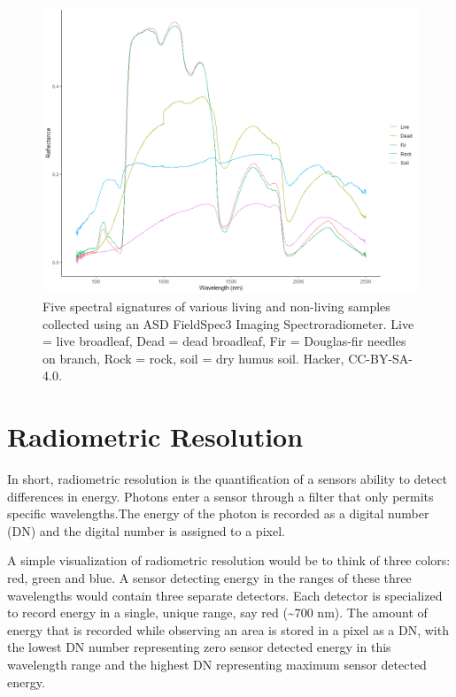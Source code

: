 \documentclass[
]{book}
\begin{document}
\begin{figure}
\includegraphics[width=2\linewidth]{images/11-spectralsig} \caption{Five spectral signatures of various living and non-living samples collected using an ASD FieldSpec3 Imaging Spectroradiometer. Live = live broadleaf, Dead = dead broadleaf, Fir = Douglas-fir needles on branch, Rock = rock, soil = dry humus soil. Hacker, CC-BY-SA-4.0.}\label{fig:11-specsig}
\end{figure}

\section{Radiometric Resolution}\label{radiometric-resolution}

In short, radiometric resolution is the quantification of a sensors ability to detect differences in energy. Photons enter a sensor through a filter that only permits specific wavelengths.The energy of the photon is recorded as a digital number (DN) and the digital number is assigned to a pixel.

A simple visualization of radiometric resolution would be to think of three colors: red, green and blue. A sensor detecting energy in the ranges of these three wavelengths would contain three separate detectors. Each detector is specialized to record energy in a single, unique range, say red (\textasciitilde700 nm). The amount of energy that is recorded while observing an area is stored in a pixel as a DN, with the lowest DN number representing zero sensor detected energy in this wavelength range and the highest DN representing maximum sensor detected energy.
\end{document}

